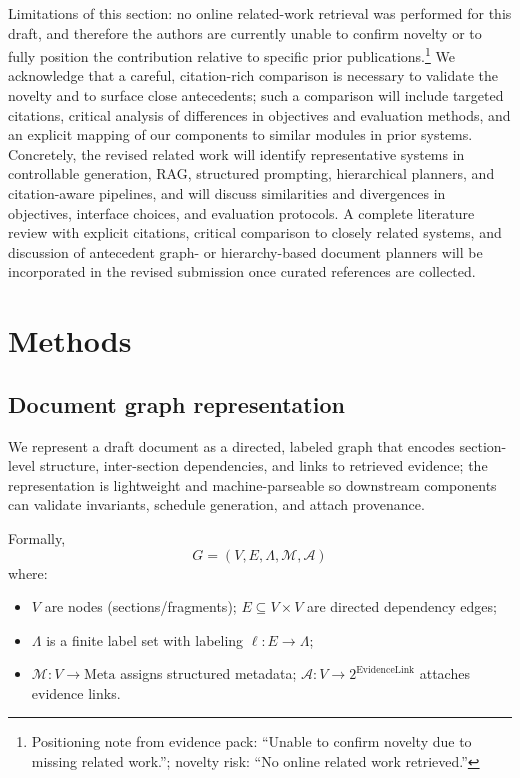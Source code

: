 \documentclass{article}%
\begin{document}
Limitations of this section: no online related-work retrieval was performed for this draft, and therefore the authors are currently unable to confirm novelty or to fully position the contribution relative to specific prior publications.\footnote{Positioning note from evidence pack: ``Unable to confirm novelty due to missing related work.''; novelty risk: ``No online related work retrieved.''} We acknowledge that a careful, citation-rich comparison is necessary to validate the novelty and to surface close antecedents; such a comparison will include targeted citations, critical analysis of differences in objectives and evaluation methods, and an explicit mapping of our components to similar modules in prior systems. Concretely, the revised related work will identify representative systems in controllable generation, RAG, structured prompting, hierarchical planners, and citation-aware pipelines, and will discuss similarities and divergences in objectives, interface choices, and evaluation protocols. A complete literature review with explicit citations, critical comparison to closely related systems, and discussion of antecedent graph- or hierarchy-based document planners will be incorporated in the revised submission once curated references are collected.%

%
\section{Methods}%
\subsection{Document graph representation}%


%
We represent a draft document as a directed, labeled graph that encodes section-level structure, inter-section dependencies, and links to retrieved evidence; the representation is lightweight and machine-parseable so downstream components can validate invariants, schedule generation, and attach provenance.

Formally,
\[
G = (V,E,\Lambda,\mathcal{M},\mathcal{A})
\]
where: \begin{itemize}
  \item $V$ are nodes (sections/fragments); $E\subseteq V\times V$ are directed dependency edges;
  \item $\Lambda$ is a finite label set with labeling $\ell:E\to\Lambda$;
  \item $\mathcal{M}:V\to\mathrm{Meta}$ assigns structured metadata; $\mathcal{A}:V\to 2^{\mathrm{EvidenceLink}}$ attaches evidence links.
\end{itemize}
\end{document}
